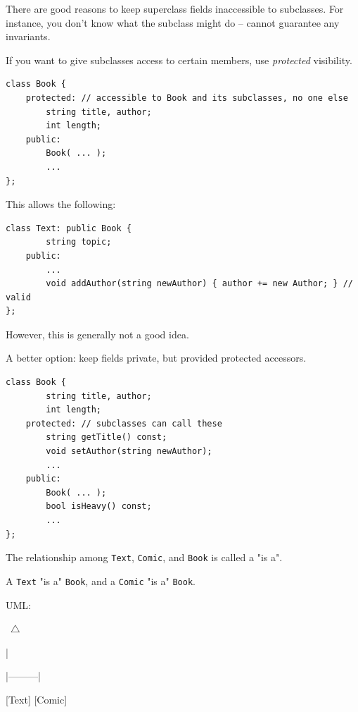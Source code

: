 \documentclass[11pt]{article}
\theoremstyle{definition}
\begin{document}
There are good reasons to keep superclass fields inaccessible to subclasses. For instance, you don't know what the subclass might do -- cannot guarantee any invariants.

If you want to give subclasses access to certain members, use {\it protected} visibility.
\begin{lstlisting}
class Book {
    protected: // accessible to Book and its subclasses, no one else
        string title, author;
        int length;
    public:
        Book( ... );
        ...
};
\end{lstlisting}
\vspace{-0.25cm}
This allows the following:
\begin{lstlisting}
class Text: public Book {
        string topic;
    public:
        ...
        void addAuthor(string newAuthor) { author += new Author; } // valid
};
\end{lstlisting}
\vspace{-0.25cm}
However, this is generally not a good idea.

A better option: keep fields private, but provided protected accessors. 
\begin{lstlisting}
class Book {
        string title, author;
        int length;
    protected: // subclasses can call these
        string getTitle() const;
        void setAuthor(string newAuthor);
        ...
    public:
        Book( ... );
        bool isHeavy() const;
        ...
};
\end{lstlisting}
\vspace{-0.25cm}
The relationship among {\tt Text}, {\tt Comic}, and {\tt Book} is called a "is a". 

A {\tt Text} "is a" {\tt Book}, and a {\tt Comic} "is a" {\tt Book}.

\newpage
UML:

\quad  [ Book ]
 
\quad\quad \,     $\triangle$

\quad\quad \;     |

\quad  |---------|
    
[Text]   [Comic]

\end{document}
